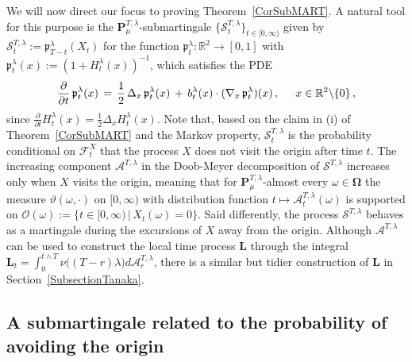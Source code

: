 \documentclass[10pt]{article}
\numberwithin{equation}{section}
\theoremstyle{definition}
\newcommand{\R}{{\mathbb R}}
\begin{document}
We will now direct our focus to proving Theorem~\ref{CorSubMART}.  A natural tool for this purpose is the $\mathbf{P}_{\mu}^{T,\lambda}$-submartingale $\{\mathcal{S}^{T,\lambda}_t\}_{t\in [0,\infty)}$ given by
$ \mathcal{S}^{T,\lambda}_t:=\mathfrak{p}_{T-t}^{\lambda}(X_t)$ for the function $\mathfrak{p}_{t}^{\lambda}:\R^2\rightarrow [0,1]  $ with $\mathfrak{p}_{t}^{\lambda}(x):=(1+H_{t}^{\lambda}( x) )^{-1}$,  which satisfies the PDE
\begin{align}\label{PartialForP}
\frac{\partial}{\partial t}\,\mathfrak{p}_{t}^{\lambda}(x)\,=\,  \frac{1}{2}\, \Delta_x \,\mathfrak{p}_{t}^{\lambda}(x)\,+\, b_t^{\lambda}(x)\cdot (\nabla_x\,\mathfrak{p}_{t}^{\lambda})(x)\,, \hspace{.5cm} x\in \R^2\backslash \{0\}\,,
\end{align}
since $\frac{\partial}{\partial t} H_{t}^{\lambda}( x)= \frac{1}{2} \Delta_x H_{t}^{\lambda}( x)$.
Note that, based on the claim in (i) of Theorem~\ref{CorSubMART} and the Markov property, $ \mathcal{S}^{T,\lambda}_t$ is the probability   conditional on $\mathscr{F}^{X}_t$ that the process $X$ does not visit  the origin after time $t$.  The increasing component $ \mathcal{A}^{T,\lambda}$ in the Doob-Meyer decomposition of  $ \mathcal{S}^{T,\lambda}$ increases only when $X$ visits the origin, meaning that for $\mathbf{P}_{\mu}^{T,\lambda}$-almost every $\omega\in \boldsymbol{\Omega}  $ the  measure $\vartheta(\omega, \cdot )$ on $[0,\infty)$ with distribution function $t\mapsto  \mathcal{A}^{T,\lambda}_t(\omega) $ is  supported on $\mathscr{O}(\omega):=\big\{t\in [0,\infty)\,\big|\,X_t(\omega)=0  \big\}$. Said differently, the process $ \mathcal{S}^{T,\lambda}$ behaves as a martingale during the  excursions of $X$ away from the origin.   Although $\mathcal{A}^{T,\lambda} $ can be used to construct the local time process $\mathbf{L}$ through the integral
$
\mathbf{L}_t=\int_0^{t\wedge T} \nu\big( (T-r)\lambda\big) d\mathcal{A}^{T,\lambda}_r
$,
there is a similar but tidier construction of $ \mathbf{L}$ in Section~\ref{SubsectionTanaka}.







\subsection{A submartingale related  to the probability of avoiding the origin}
\end{document}
